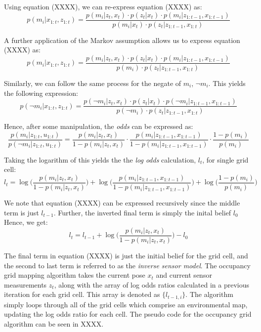 \documentclass[a4paper]{article}
\begin{document}
Using equation (XXXX), we can re-express equation (XXXX) as:
\begin{equation}
p(m_i | x_{1:t}, z_{1:t}) = \frac{p(m_i | z_t, x_t) \cdot p(z_t | x_t) \cdot p(m_i | z_{1:t-1}, x_{1:t-1})}{p(m_i | x_t) \cdot p(z_t | z_{1:t-1}, x_{1:t})}
\end{equation}

A further application of the Markov assumption allows us to express equation (XXXX) as:
\begin{equation}
p(m_i | x_{1:t}, z_{1:t}) = \frac{p(m_i | z_t, x_t) \cdot p(z_t | x_t) \cdot p(m_i | z_{1:t-1}, x_{1:t-1})}{p(m_i) \cdot p(z_t | z_{1:t-1}, x_{1:t})}
\end{equation}

Similarly, we can follow the same process for the negate of $m_i$, $\neg m_i$. This yields the following expression:
\begin{equation}
p(\neg m_i | x_{1:t}, z_{1:t}) = \frac{p(\neg m_i | z_t, x_t) \cdot p(z_t | x_t) \cdot p(\neg m_i | z_{1:t-1}, x_{1:t-1})}{p( \neg m_i) \cdot p(z_t | z_{1:t-1}, x_{1:t})}
\end{equation}

Hence, after some manipulation, the \textit{odds} can be expressed as:
\begin{equation}
\frac{p(m_i | z_{1:t}, u_{1:t})}{p( \neg m_i | z_{1:t}, u_{1:t})} = \frac{p(m_i | z_t, x_t)}{1 - p(m_i | z_t, x_t)} \cdot \frac{p(m_i | z_{1:t-1}, x_{1:t-1})}{1 - p(m_i | z_{1:t-1}, x_{1:t-1})} \cdot \frac{1 - p(m_i)}{p(m_i)}
\end{equation}

Taking the logarithm of this yields the the \textit{log odds} calculation, $l_t$, for single grid cell:
\begin{equation}
l_t = \log \bigg( \frac{p(m_i | z_t, x_t)}{1 - p(m_i | z_t, x_t)} \bigg) + \log \bigg( \frac{p(m_i | z_{1:t-1}, x_{1:t-1})}{1 - p(m_i | z_{1:t-1}, x_{1:t-1})} \bigg) + \log \bigg( \frac{1 - p(m_i)}{p(m_i)} \bigg)
\end{equation}

We note that equation (XXXX) can be expressed recursively since the middle term is just $l_{t-1}$. Further, the inverted final term is simply the inital belief $l_0$ Hence, we get:
\begin{equation}
l_t = l_{t-1} + \log \bigg( \frac{p(m_i | z_t, x_t)}{1 - p(m_i | z_t, x_t)} \bigg) - l_0
\end{equation}

The final term in equation (XXXX) is just the initial belief for the grid cell, and the second to last term is referred to as the \textit{inverse sensor model}. The occupancy grid mapping algorithm takes the current pose $x_t$ and current sensor measurements $z_t$, along with the array of log odds ratios calculated in a previous iteration for each grid cell. This array is denoted as $\{l_{t-1,i}\}$. The algorithm simply loops through all of the grid cells which comprise an environmental map, updating the log odds ratio for each cell. The pseudo code for the occupancy grid algorithm can be seen in XXXX.
\end{document}
